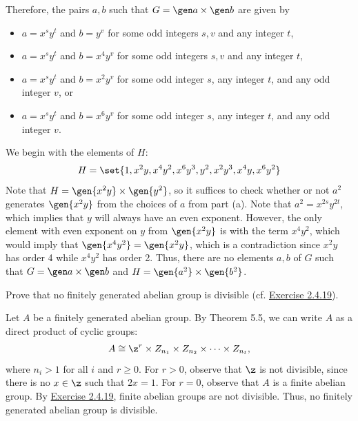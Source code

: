 \begin{solalph}
\begin{enumerate}[label=(\arabic*)]
    \end{enumerate}
    Therefore, the pairs $a, b$ such that $G = \gen a \times \gen b$ are given by
    \begin{itemize}
        \item $a = x^s y^t$ and $b = y^v$ for some odd integers $s, v$ and any integer $t$,
        \item $a = x^s y^t$ and $b = x^4 y^v$ for some odd integers $s, v$ and any integer $t$,
        \item $a = x^s y^t$ and $b = x^2 y^v$ for some odd integer $s$, any integer $t$, and any odd integer $v$, or
        \item $a = x^s y^t$ and $b = x^6 y^v$ for some odd integer $s$, any integer $t$, and any odd integer $v$.
    \end{itemize}
    \item We begin with the elements of $H$:
    \[H = \set{1, x^2y, x^4y^2, x^6y^3, y^2, x^2y^3, x^4y, x^6y^2}\]
    Note that $H = \gen{x^2y} \times \gen{y^2}$, so it suffices to check whether or not $a^2$ generates $\gen{x^2y}$ from the choices of $a$ from part (a). Note that $a^2 = x^{2s} y^{2t}$, which implies that $y$ will always have an even exponent. However, the only element with even exponent on $y$ from $\gen{x^2y}$ is with the term $x^4y^2$, which would imply that $\gen{x^4y^2} = \gen{x^2y}$, which is a contradiction since $x^2y$ has order 4 while $x^4y^2$ has order 2. Thus, there are no elements $a, b$ of $G$ such that $G = \gen a \times \gen b$ and $H = \gen{a^2} \times \gen{b^2}$.
\end{solalph}

\newpage

\begin{exercise}\label{ex5.2.16}
    Prove that no finitely generated abelian group is divisible (cf. \hyperref[ex2.4.19]{Exercise 2.4.19}).
\end{exercise}

\begin{sol}
    Let $A$ be a finitely generated abelian group. By Theorem 5.5, we can write $A$ as a direct product of cyclic groups:
    \[A \cong \z^r \times Z_{n_1} \times Z_{n_2} \times \cdots \times Z_{n_t},\]
    where $n_i > 1$ for all $i$ and $r \geq 0$. For $r > 0$, observe that $\z$ is not divisible, since there is no $x \in \z$ such that $2x = 1$. For $r = 0$, observe that $A$ is a finite abelian group. By \hyperref[ex2.4.19]{Exercise 2.4.19}, finite abelian groups are not divisible. Thus, no finitely generated abelian group is divisible.
\end{sol}

